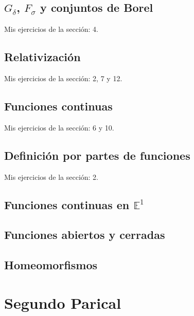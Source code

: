 \documentclass[12pt]{report}
\theoremstyle{largebreak}
\begin{document}
    \newpage

    \section{$G_\delta$, $F_\sigma$ y conjuntos de Borel}

    Mis ejercicios de la sección: 4.

    \newpage

    \section{Relativización}

    Mis ejercicios de la sección: 2, 7 y 12.

    \newpage

    \section{Funciones continuas}

    Mis ejercicios de la sección: 6 y 10.

    \newpage

    \section{Definición por partes de funciones}

    Mis ejercicios de la sección: 2.

    \newpage

    \section{Funciones continuas en $\mathbb{E}^1$}

    \newpage

    \section{Funciones abiertos y cerradas}

    \newpage

    \section{Homeomorfismos}
    
    \chapter{Segundo Parical}
\end{document}
